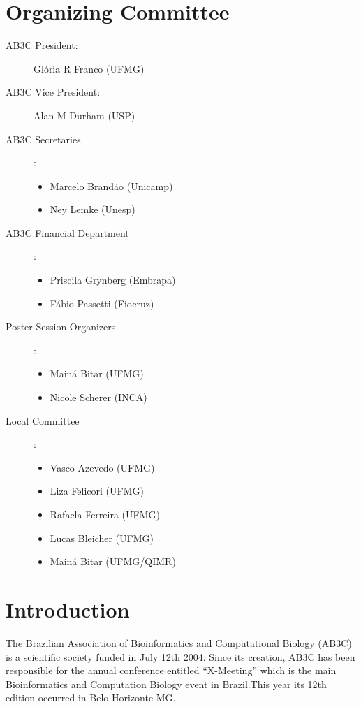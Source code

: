 
\chapter{Organizing Committee}

\begin{description}

\item[AB3C President:] Glória R Franco (UFMG)

\item[AB3C Vice President:] Alan M Durham (USP)


\item[AB3C Secretaries]:

\begin{itemize}
 \item Marcelo Brandão (Unicamp) 
\item  Ney Lemke (Unesp)
\end{itemize}

\item[AB3C Financial Department]:

\begin{itemize}
\item Priscila Grynberg (Embrapa)
\item Fábio Passetti (Fiocruz)
\end{itemize}

\item[Poster Session Organizers]:

\begin{itemize}
\item Mainá Bitar (UFMG)
\item Nicole Scherer (INCA)
\end{itemize}

\item[Local Committee]:

\begin{itemize}
\item Vasco Azevedo (UFMG)
\item Liza Felicori (UFMG)
\item Rafaela Ferreira (UFMG)
\item Lucas Bleicher (UFMG)
\item Mainá Bitar (UFMG/QIMR)
\end{itemize}
\end{description}
\newpage
\chapter{Introduction}
The Brazilian Association of Bioinformatics and Computational Biology (AB3C) is
a scientific society funded in July 12th 2004.
Since its creation, AB3C has been responsible for the annual conference entitled
“X-Meeting” which is the main Bioinformatics and Computation Biology event in
Brazil.This year its 12th edition occurred in Belo Horizonte MG.

